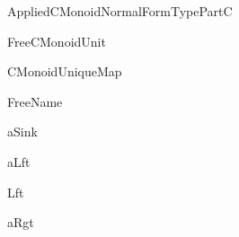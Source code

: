 \newcommand\AppliedCMonoidNormalFormTypePartC[1][]{\UseVerb[#1]{AppliedCMonoidNormalFormTypePartC}}
\begin{SaveVerbatim}[commandchars=\\\{\}]{AppliedCMonoidNormalFormTypePartC}
\KatlaSpace{}\KatlaSpace{}\IdrisKeyword{=}
\end{SaveVerbatim}
\newcommand\FreeCMonoidUnit[1][]{\UseVerb[#1]{FreeCMonoidUnit}}
\begin{SaveVerbatim}[commandchars=\\\{\}]{FreeCMonoidUnit}
\end{SaveVerbatim}
\newcommand\CMonoidUniqueMap[1][]{\UseVerb[#1]{CMonoidUniqueMap}}
\begin{SaveVerbatim}[commandchars=\\\{\}]{CMonoidUniqueMap}
\KatlaSpace{}\IdrisKeyword{(}\KatlaSpace{}\IdrisKeyword{(\textbackslash{}}\IdrisKeyword{,}\KatlaSpace{}\IdrisKeyword{=>}\KatlaSpace{}\KatlaSpace{}\KatlaSpace{}\KatlaSpace{}\IdrisKeyword{)}\KatlaSpace{}\IdrisKeyword{)}
\end{SaveVerbatim}
\newcommand\FreeName[1][]{\UseVerb[#1]{FreeName}}
\begin{SaveVerbatim}[commandchars=\\\{\}]{FreeName}
\end{SaveVerbatim}
\newcommand\aSink[1][]{\UseVerb[#1]{aSink}}
\begin{SaveVerbatim}[commandchars=\\\{\}]{aSink}
\end{SaveVerbatim}
\newcommand\aLft[1][]{\UseVerb[#1]{aLft}}
\begin{SaveVerbatim}[commandchars=\\\{\}]{aLft}
\end{SaveVerbatim}
\newcommand\Lft[1][]{\UseVerb[#1]{Lft}}
\begin{SaveVerbatim}[commandchars=\\\{\}]{Lft}
\end{SaveVerbatim}
\newcommand\aRgt[1][]{\UseVerb[#1]{aRgt}}
\begin{SaveVerbatim}[commandchars=\\\{\}]{aRgt}
\end{SaveVerbatim}
